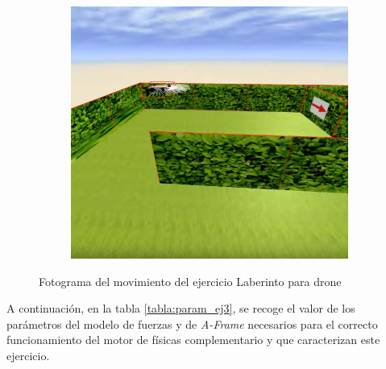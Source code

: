 \begin{figure}[h!]
\begin{subfigure}[b]{0.3\textwidth}
  \end{subfigure}
    \hfill
    \hfill
  \begin{subfigure}[b]{0.3\textwidth}
    \includegraphics[width=\textwidth, height=\textwidth]{drone3.png}
  \end{subfigure}
    \hfill
    \caption{Fotograma del movimiento del ejercicio Laberinto para drone}
    \label{fig:laberinto_drone_movimiento}
\end{figure}

A continuación, en la tabla \ref{tabla:param_ej3}, se recoge el valor de los parámetros del modelo de fuerzas y de  \textit{A-Frame} necesarios para el correcto funcionamiento del motor de físicas complementario y que caracterizan este ejercicio.

